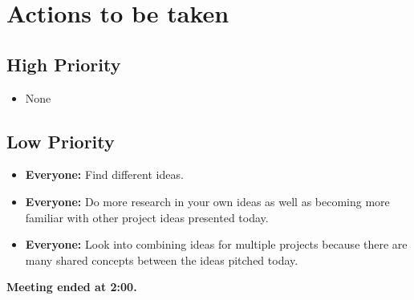 \documentclass[a4paper]{article}
\begin{document}
	\section{Actions to be taken}
	\subsection{High Priority}
	\begin{itemize}
 		\item None
	\end{itemize}
	\subsection{Low Priority}
	\begin{itemize}
		\item \textbf{Everyone:} Find different ideas.
		\item \textbf{Everyone:} Do more research in your own ideas as well as becoming more familiar with other project ideas presented today.
		\item \textbf{Everyone:} Look into combining ideas for multiple projects because there are many shared concepts between the ideas pitched today.
	\end{itemize}
	\textbf{Meeting ended at 2:00.}
\end{document}
